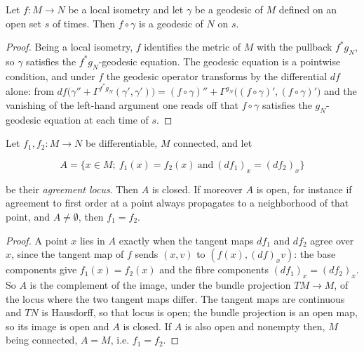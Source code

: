 \begin{lemma}
  \label{lem:dc-ch8-4-2-geodesic-push}

  Let $f:M\to N$ be a local isometry and let $\gamma$ be a geodesic of $M$ defined on
  an open set $s$ of times. Then $f\circ\gamma$ is a geodesic of $N$ on $s$.
\end{lemma}
\begin{proof}

\sketch
  Being a local isometry, $f$ identifies the metric of $M$ with the pullback $f^*g_N$,
  so $\gamma$ satisfies the $f^*g_N$-geodesic equation. The geodesic equation is a
  pointwise condition, and under $f$ the geodesic operator transforms by the
  differential $df$ alone: from $df\big(\gamma''+\Gamma^{f^*g_N}(\gamma',\gamma')\big)
  =(f\circ\gamma)''+\Gamma^{g_N}\big((f\circ\gamma)',(f\circ\gamma)'\big)$ and the
  vanishing of the left-hand argument one reads off that $f\circ\gamma$ satisfies the
  $g_N$-geodesic equation at each time of $s$.
\end{proof}

\begin{lemma}
  \label{lem:dc-ch8-4-2-agree-locus}

  Let $f_1,f_2:M\to N$ be differentiable, $M$ connected, and let

  $$
  A=\{x\in M;\ f_1(x)=f_2(x)\ \text{and}\ (df_1)_x=(df_2)_x\}
  $$

  be their \emph{agreement locus}. Then $A$ is closed. If moreover $A$ is open, for
  instance if agreement to first order at a point always propagates to a neighborhood
  of that point, and $A\neq\emptyset$, then $f_1=f_2$.
\end{lemma}
\begin{proof}

\sketch
  A point $x$ lies in $A$ exactly when the tangent maps $df_1$ and $df_2$ agree over
  $x$, since the tangent map of $f$ sends $(x,v)$ to $(f(x),(df)_x v)$: the base
  components give $f_1(x)=f_2(x)$ and the fibre components $(df_1)_x=(df_2)_x$. So $A$
  is the complement of the image, under the bundle projection $TM\to M$, of the locus
  where the two tangent maps differ. The tangent maps are continuous and $TN$ is
  Hausdorff, so that locus is open; the bundle projection is an open map, so its image
  is open and $A$ is closed. If $A$ is also open and nonempty then, $M$ being
  connected, $A=M$, i.e. $f_1=f_2$.
\end{proof}

